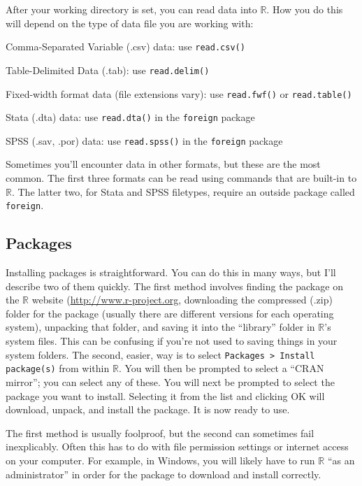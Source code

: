 \documentclass[12pt]{article}
\begin{document}
After your working directory is set, you can read data into $\mathbb{R}$.  How you do this will depend on the type of data file you are working with:
\begin{itemize*}
\item Comma-Separated Variable (.csv) data: use \verb|read.csv()|
\item Table-Delimited Data (.tab): use \verb|read.delim()|
\item Fixed-width format data (file extensions vary): use \verb|read.fwf()| or \verb|read.table()|
\item Stata (.dta) data: use \verb|read.dta()| in the \verb|foreign| package
\item SPSS (.sav, .por) data: use \verb|read.spss()| in the \verb|foreign| package
\end{itemize*}
Sometimes you'll encounter data in other formats, but these are the most common. The first three formats can be read using commands that are built-in to $\mathbb{R}$. The latter two, for Stata and SPSS filetypes, require an outside package called \verb|foreign|.

\subsection{Packages}
Installing packages is straightforward. You can do this in many ways, but I'll describe two of them quickly. The first method involves finding the package on the $\mathbb{R}$ website (\url{http://www.r-project.org}, downloading the compressed (.zip) folder for the package (usually there are different versions for each operating system), unpacking that folder, and saving it into the ``library'' folder in $\mathbb{R}$'s system files. This can be confusing if you're not used to saving things in your system folders. The second, easier, way is to select \verb|Packages > Install package(s)| from within $\mathbb{R}$. You will then be prompted to select a ``CRAN mirror''; you can select any of these. You will next be prompted to select the package you want to install. Selecting it from the list and clicking OK will download, unpack, and install the package. It is now ready to use.

The first method is usually foolproof, but the second can sometimes fail inexplicably. Often this has to do with file permission settings or internet access on your computer. For example, in Windows, you will likely have to run $\mathbb{R}$ ``as an administrator'' in order for the package to download and install correctly.
\end{document}
